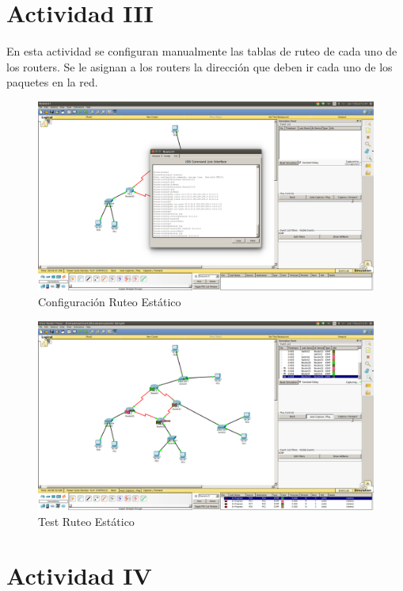 ﻿\documentclass[spanish]{udpreport}
\begin{document}
\section{Actividad III}

En esta actividad se configuran manualmente las tablas de ruteo de cada uno de los routers. Se le asignan a los routers la dirección que deben ir cada uno de los paquetes en la red.

\begin{figure}[H]
	\centering
	\includegraphics[scale=.25]{imagenes/ruteo_estatico.png}
	\caption{Configuración Ruteo Estático}
	\label{fig:Figura 4.1}
\end{figure}

\begin{figure}[H]
	\centering
	\includegraphics[scale=.25]{imagenes/test_restatico.png}
	\caption{Test Ruteo Estático}
	\label{fig:Figura 4.2}
\end{figure}

\section{Actividad IV}
\end{document}
